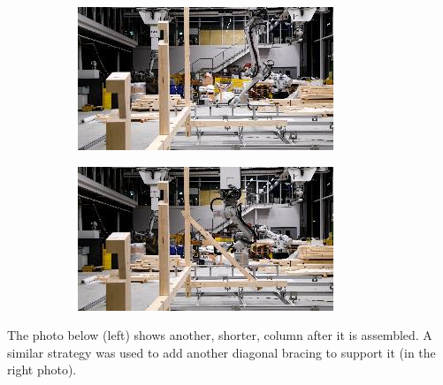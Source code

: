 \documentclass[11pt]{book}
\begin{document}
\begin{figure}[H]
\centering
\begin{subfigure}[b]{0.45\textwidth}
\centering
\includegraphics[width=\textwidth]{./images/image63.jpeg}
\end{subfigure}
\hfill
\begin{subfigure}[b]{0.45\textwidth}
\centering
\includegraphics[width=\textwidth]{./images/image64.jpeg}
\end{subfigure}
\end{figure}


The photo below (left) shows another, shorter, column after it is assembled. A similar strategy was used to add another diagonal bracing to support it (in the right photo).
\end{document}
